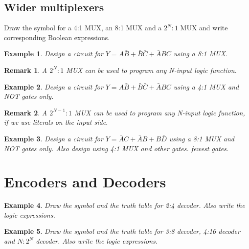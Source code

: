 \documentclass{article}
\newtheorem{example}{Example}
\newtheorem{remark}{Remark}
\newcommand{\bA}{\bar{A}}
\newcommand{\bB}{\bar{B}}
\newcommand{\bC}{\bar{C}}
\newcommand{\bD}{\bar{D}}
\begin{document}
\subsection{Wider multiplexers}
Draw the symbol for a 4:1 MUX, an 8:1 MUX and a $2^N:1$ MUX and write
corresponding Boolean expressions.
\vspace{10em}


\begin{example}
  Design a circuit for $Y = A\bB + \bB \bC + \bA B C$ using a 8:1 MUX.
\end{example}
\vspace{10em}

\begin{remark}
  A $2^N:1$ MUX can be used to program any N-input logic function.
\end{remark}

\begin{example}
  Design a circuit for $Y = A\bB + \bB \bC + \bA B C$ using a 4:1 MUX and 
  NOT gates only.
\end{example}
\vspace{10em}

\begin{remark}
  A $2^{N-1}:1$ MUX can be used to program any N-input logic function, if we use
  literals on the input side.
\end{remark}

\begin{example}
  Design a circuit for $Y = \bA C + \bA B + B \bD $ using a 8:1 MUX and NOT
  gates only. Also design using 4:1 MUX and other gates.
   fewest gates.
\end{example}
\vspace{10em}

\section{Encoders and Decoders}

\begin{example}
Draw the symbol and the truth table for 2:4 decoder. Also write the logic expressions.
\end{example}
\vspace{10em}

\begin{example}
  Draw the symbol and the truth table for 3:8 decoder, 4:16 decoder and $N:2^N$ decoder. Also write the logic expressions.
\end{example}
\vspace{10em}
\end{document}

